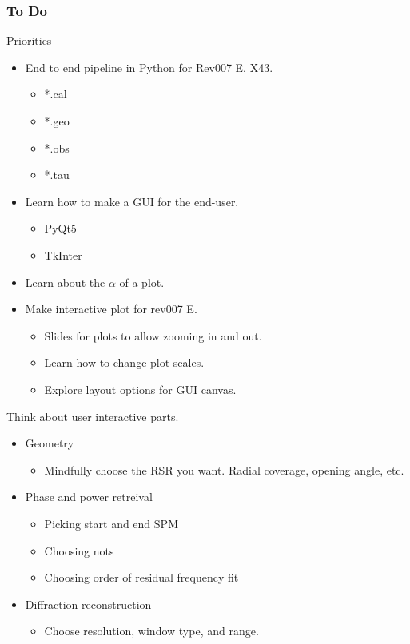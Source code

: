 \documentclass[crop=false,class=book]{standalone}
\begin{document}
\subsubsection{\scriptsize To Do}
Priorities
\begin{itemize}
    \item End to end pipeline in Python for Rev007 E, X43.
    \begin{itemize}
        \item *.cal
        \item *.geo
        \item *.obs
        \item *.tau
    \end{itemize}
    \item Learn how to make a GUI for the end-user.
    \begin{itemize}
        \item PyQt5
        \item TkInter
    \end{itemize}
    \item Learn about the $\alpha$ of a plot.
    \item Make interactive plot for rev007 E.
    \begin{itemize}
        \item Slides for plots to allow zooming in and out.
        \item Learn how to change plot scales.
        \item Explore layout options for GUI canvas.
    \end{itemize}
\end{itemize}
Think about user interactive parts.
\begin{itemize}
    \item Geometry
    \begin{itemize}
        \item Mindfully choose the RSR you want. Radial coverage, opening angle, etc.
    \end{itemize}
    \item Phase and power retreival
    \begin{itemize}
        \item Picking start and end SPM
        \item Choosing nots
        \item Choosing order of residual frequency fit
    \end{itemize}
    \item Diffraction reconstruction
    \begin{itemize}
        \item Choose resolution, window type, and range.
    \end{itemize}
\end{itemize}
\end{document}
